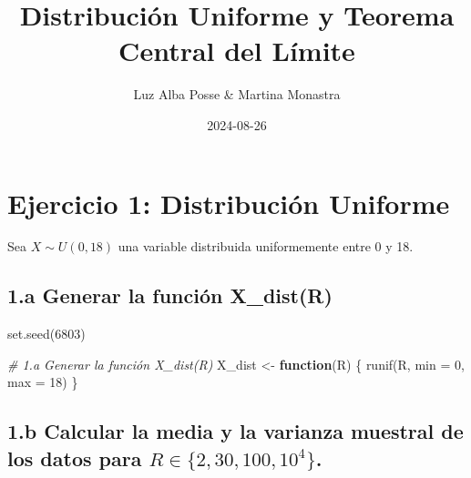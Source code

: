 \documentclass[
]{article}
\title{Distribución Uniforme y Teorema Central del Límite}
\author{Luz Alba Posse \& Martina Monastra}
\date{2024-08-26}
\newenvironment{Shaded}{}{}
\newcommand{\AttributeTok}[1]{\textcolor[rgb]{0.49,0.56,0.16}{#1}}
\newcommand{\CommentTok}[1]{\textcolor[rgb]{0.38,0.63,0.69}{\textit{#1}}}
\newcommand{\ControlFlowTok}[1]{\textcolor[rgb]{0.00,0.44,0.13}{\textbf{#1}}}
\newcommand{\DecValTok}[1]{\textcolor[rgb]{0.25,0.63,0.44}{#1}}
\newcommand{\FunctionTok}[1]{\textcolor[rgb]{0.02,0.16,0.49}{#1}}
\newcommand{\NormalTok}[1]{#1}
\newcommand{\OtherTok}[1]{\textcolor[rgb]{0.00,0.44,0.13}{#1}}
\begin{document}
\maketitle

\section{Ejercicio 1: Distribución
Uniforme}\label{ejercicio-1-distribuciuxf3n-uniforme}

Sea \(X \sim U(0, 18)\) una variable distribuida uniformemente entre 0 y
18.

\subsection{1.a Generar la función
X\_dist(R)}\label{a-generar-la-funciuxf3n-x_distr}

\begin{Shaded}
\begin{Highlighting}[]
\FunctionTok{set.seed}\NormalTok{(}\DecValTok{6803}\NormalTok{)}

\CommentTok{\# 1.a Generar la función X\_dist(R)}
\NormalTok{X\_dist }\OtherTok{\textless{}{-}} \ControlFlowTok{function}\NormalTok{(R) \{}
  \FunctionTok{runif}\NormalTok{(R, }\AttributeTok{min =} \DecValTok{0}\NormalTok{, }\AttributeTok{max =} \DecValTok{18}\NormalTok{)}
\NormalTok{\}}
\end{Highlighting}
\end{Shaded}

\subsection{\texorpdfstring{1.b Calcular la media y la varianza muestral
de los datos para
\(R \in \{2, 30, 100, 10^4\}\).}{1.b Calcular la media y la varianza muestral de los datos para R \textbackslash in \textbackslash\{2, 30, 100, 10\^{}4\textbackslash\}.}}\label{b-calcular-la-media-y-la-varianza-muestral-de-los-datos-para-r-in-2-30-100-104.}
\end{document}
